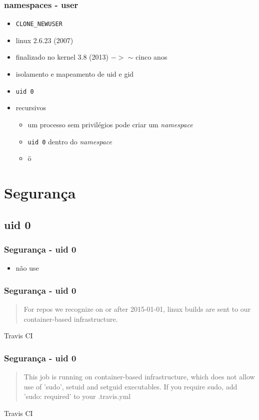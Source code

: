\documentclass{beamer}
\begin{document}
\begin{frame}
    \frametitle{namespaces - user}
    \begin{itemize}
        \item \texttt{CLONE\_NEWUSER}
        \item linux 2.6.23 (2007)
        \item finalizado no kernel 3.8 (2013) $->$ $\sim$ cinco anos
        \item isolamento e mapeamento de uid e gid
        \item \texttt{uid 0}
        \item recursivos
        \begin{itemize}
            \item um processo sem privilégios pode criar um \textit{namespace}
            \item \texttt{uid 0} dentro do \textit{namespace}
            \item ö
        \end{itemize}
    \end{itemize}
\end{frame}

\section{Segurança}

\subsection{uid 0}

\begin{frame}
    \frametitle{Segurança - uid 0}
    \begin{itemize}
        \item não use
    \end{itemize}
\end{frame}

\begin{frame}
    \frametitle{Segurança - uid 0}
    \begin{quote}
        For repos we recognize on or after 2015-01-01, linux builds are sent to
        our container-based infrastructure.
    \end{quote}
    Travis CI
\end{frame}

\begin{frame}
    \frametitle{Segurança - uid 0}
    \begin{quote}
        This job is running on container-based infrastructure, which does not
        allow use of 'sudo', setuid and setguid executables.  If you require
        sudo, add 'sudo: required' to your .travis.yml
    \end{quote}
    Travis CI
\end{frame}
\end{document}

